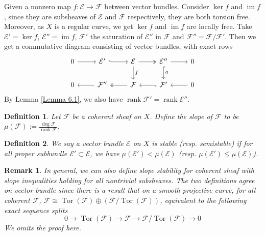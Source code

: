 \documentclass{ctexart}
\newtheorem{definition}{Definition}[section]
\newtheorem{remark}{Remark}[section]
\newcommand{\rank}{\operatorname{rank}}
\newcommand{\im}{\operatorname{im}}
\newcommand{\tor}{\operatorname{Tor}}
\begin{document}
Given a nonzero map $f: \mathcal{E} \rightarrow \mathcal{F}$ between vector bundles.
Consider $\ker f$ and $\im f$, since they are subsheaves of $\mathcal{E}$ and $\mathcal{F}$ respectively, they are both torsion free.
Moreover, as $X$ is a regular curve, we get $\ker f$ and $\im f$ are locally free.
Take $\mathcal{E}' = \ker f$, $\mathcal{E}'' = \im f$, $\mathcal{F}'$ the saturation of $\mathcal{E}''$ in $\mathcal{F}$ and $\mathcal{F}'' = \mathcal{F}/\mathcal{F}'$.
Then we get a commutative diagram consisting of vector bundles, with exact rows
\begin{equation}
    \begin{tikzcd}
        0 \arrow[r] &
        \mathcal{E}' \arrow[r, hookrightarrow] &
        \mathcal{E} \arrow[r, twoheadrightarrow] \arrow[d, "f"] &
        \mathcal{E}'' \arrow[r] \arrow[d, hookrightarrow, "g"] &
        0 \\
        0 &
        \mathcal{F}'' \arrow[l] &
        \mathcal{F} \arrow[l, twoheadrightarrow] &
        \mathcal{F}' \arrow[l, hookrightarrow] &
        0 \arrow[l] 
    \end{tikzcd}
    \label{equation:commutative_diagram_factoring_through_map_of_maximal_rank}
\end{equation}
By Lemma \ref{Lemma 6.1}, we also have $\rank \mathcal{F}' = \rank \mathcal{E}''$.
\begin{definition}
    Let $\mathcal{F}$ be a coherent sheaf on $X$.
    Define the slope of $\mathcal{F}$ to be $\mu(\mathcal{F}) := \frac{\deg \mathcal{F}}{\rank \mathcal{F}}$.
\end{definition}
\begin{definition}
    We say a vector bundle $\mathcal{E}$ on $X$ is stable (resp. semistable) if for all proper subbundle $\mathcal{E}' \subset \mathcal{E}$,
    we have $\mu(\mathcal{E}') < \mu(\mathcal{E})$ (resp. $\mu(\mathcal{E}') \le \mu(\mathcal{E})$).
\end{definition}
\begin{remark}
    In general, we can also define slope stability for coherent sheaf with slope inequalities holding for all nontrivial subsheaves.
    The two definitions agree on vector bundle since there is a result that on a smooth projective curve,
    for all coherent $\mathcal{F}$, $\mathcal{F} \cong \tor(\mathcal{F}) \oplus (\mathcal{F}/\tor(\mathcal{F}))$,
    equivalent to the following exact sequence splits
    \begin{equation}
        0 \longrightarrow \tor(\mathcal{F}) \longrightarrow \mathcal{F} \longrightarrow \mathcal{F}/\tor(\mathcal{F}) \longrightarrow 0
    \end{equation}
    We omits the proof here.
\end{remark}
\end{document}
